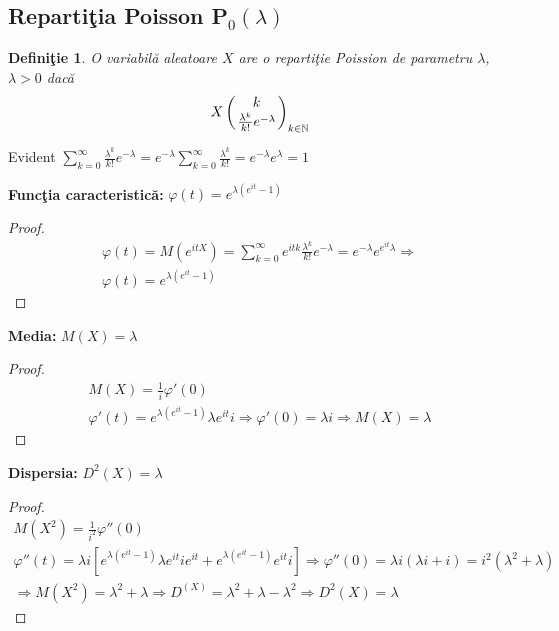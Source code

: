 \documentclass[12pt]{article}
\newtheorem{definition}{Definiţie}
\begin{document}
\subsection*{Repartiţia Poisson P$_0(\lambda)$}

\begin{definition}
	O variabilă aleatoare $X$ are o repartiţie Poission de parametru $\lambda$, $\lambda > 0$ dacă
	\[
		X \left({k \atop \frac{\lambda^k}{k!} e^{-\lambda} }\right)_{k \in \mathbb{N}}
	\]
\end{definition}

Evident $\sum_{k=0}^\infty \frac{\lambda^k}{k!} e^{-\lambda} = e^{-\lambda} \sum_{k=0}^\infty \frac{\lambda^k}{k!} = e^{-\lambda}e^{\lambda} = 1$


\noindent \textbf{Funcţia caracteristică:} $\varphi(t) = e^{\lambda(e^{it}-1)}$

\begin{proof}
	\begin{gather*}
		\varphi(t) = M(e^{itX}) = \sum_{k=0}^\infty e^{itk} \frac{\lambda^k}{k!} e^{-\lambda} = e^{-\lambda}e^{e^{it}\lambda} \Longrightarrow \\
		\varphi(t) = e^{\lambda(e^{it}-1)}
	\end{gather*}
\end{proof}

\noindent \textbf{Media:} $M(X) = \lambda$

\begin{proof}
	\begin{gather*}
		M(X) = \frac{1}{i} \varphi'(0) \\
		\varphi'(t) = e^{\lambda(e^{it}-1)} \lambda e^{it} i \Longrightarrow \varphi'(0) = \lambda i \Longrightarrow M(X) = \lambda
	\end{gather*}
\end{proof}

\noindent \textbf{Dispersia:} $D^2(X) = \lambda$

\begin{proof}
	\begin{gather*}
		M(X^2) = \frac{1}{i^2}\varphi''(0) \\
		\varphi''(t) = \lambda i \left[ e^{\lambda(e^{it} - 1)} \lambda e^{it} i e^{it} + e^{\lambda(e^{it} - 1)} e^{it} i \right] \Longrightarrow \varphi''(0) = \lambda i (\lambda i + i) = i^2(\lambda^2 + \lambda) \\
		\Longrightarrow M(X^2) = \lambda^2 + \lambda \Longrightarrow D^(X) = \lambda^2 + \lambda - \lambda^2 \Longrightarrow D^2(X) = \lambda
	\end{gather*}
\end{proof}
\end{document}
